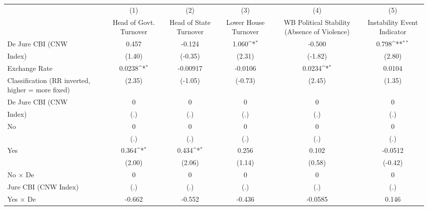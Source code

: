 {
\def\sym#1{\ifmmode^{#1}\else\(^{#1}\)\fi}
\begin{tabular}{l*{5}{c}}
\toprule
                &\multicolumn{1}{c}{(1)}&\multicolumn{1}{c}{(2)}&\multicolumn{1}{c}{(3)}&\multicolumn{1}{c}{(4)}&\multicolumn{1}{c}{(5)}\\
                &\multicolumn{1}{c}{Head of Govt. Turnover}&\multicolumn{1}{c}{Head of State Turnover}&\multicolumn{1}{c}{Lower House Turnover}&\multicolumn{1}{c}{WB Political Stability (Absence of Violence)}&\multicolumn{1}{c}{Instability Event Indicator}\\
\midrule
De Jure CBI (CNW&    0.457         &   -0.124         &    1.060\sym{*}  &   -0.500         &    0.798\sym{**} \\
Index)          &   (1.40)         &  (-0.35)         &   (2.31)         &  (-1.82)         &   (2.80)         \\
\addlinespace
Exchange Rate   &   0.0238\sym{*}  & -0.00917         &  -0.0106         &   0.0234\sym{*}  &   0.0104         \\
Classification (RR inverted, higher = more fixed)&   (2.35)         &  (-1.05)         &  (-0.73)         &   (2.45)         &   (1.35)         \\
\addlinespace
De Jure CBI (CNW&        0         &        0         &        0         &        0         &        0         \\
Index)          &      (.)         &      (.)         &      (.)         &      (.)         &      (.)         \\
\addlinespace
No              &        0         &        0         &        0         &        0         &        0         \\
                &      (.)         &      (.)         &      (.)         &      (.)         &      (.)         \\
\addlinespace
Yes             &    0.364\sym{*}  &    0.434\sym{*}  &    0.256         &    0.102         &  -0.0512         \\
                &   (2.00)         &   (2.06)         &   (1.14)         &   (0.58)         &  (-0.42)         \\
\addlinespace
No $\times$ De  &        0         &        0         &        0         &        0         &        0         \\
Jure CBI (CNW Index)&      (.)         &      (.)         &      (.)         &      (.)         &      (.)         \\
\addlinespace
Yes $\times$ De &   -0.662         &   -0.552         &   -0.436         &  -0.0585         &    0.146         \\

\end{tabular}}

